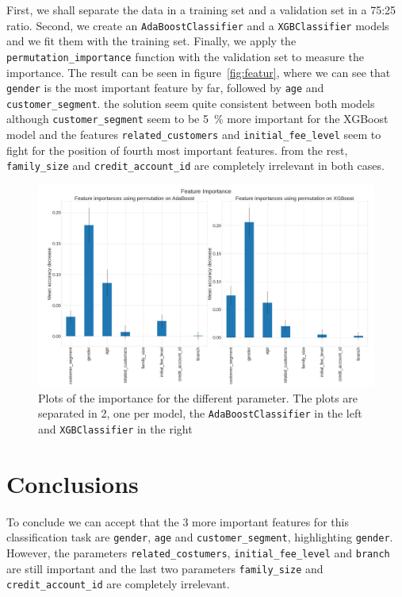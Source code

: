 \documentclass{article}
\begin{document}
First, we shall separate the data in a training set and a validation set in a 75:25 ratio. Second, we create an \texttt{AdaBoostClassifier} and a \texttt{XGBClassifier} models and we fit them with the training set. Finally, we apply the \texttt{permutation\_importance} function with the validation set to measure the importance. The result can be seen in figure~\ref{fig:featur}, where we can see that \texttt{gender} is the most important feature by far, followed by \texttt{age} and \texttt{customer\_segment}. the solution seem quite consistent between both models although \texttt{customer\_segment} seem to be 5~\% more important for the XGBoost model and the features \texttt{related\_customers} and \texttt{initial\_fee\_level} seem to fight for the position of fourth most important features. from the rest, \texttt{family\_size} and \texttt{credit\_account\_id} are completely irrelevant in both cases.


\begin{figure}
\centering
\includegraphics[width=1\textwidth]{Figures/Feature_importance.jpeg}
\caption{\label{fig:feature}Plots of the importance for the different parameter. The plots are separated in 2, one per model, the \texttt{AdaBoostClassifier} in the left and \texttt{XGBClassifier} in the right}
\end{figure}



\section{Conclusions}

To conclude we can accept that the 3 more important features for this classification task are \texttt{gender}, \texttt{age} and \texttt{customer\_segment}, highlighting \texttt{gender}. However, the parameters \texttt{related\_costumers}, \texttt{initial\_fee\_level} and \texttt{branch} are still important and the last two parameters \texttt{family\_size} and \texttt{credit\_account\_id} are completely irrelevant.
\end{document}
